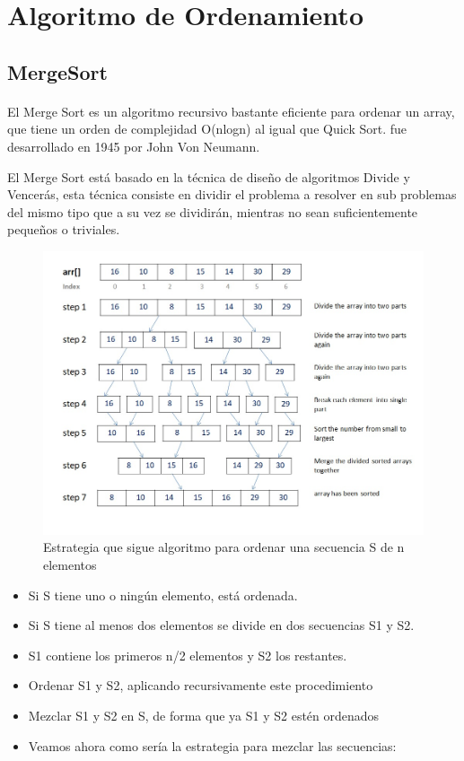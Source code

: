 \documentclass{article}
\begin{document}
	\section{Algoritmo de Ordenamiento}\label{sec:ejercicios}



     \subsection{MergeSort}
    \paragraph{}
    El Merge Sort es un algoritmo recursivo bastante eficiente para ordenar un array, que tiene un orden de complejidad O(nlogn) al igual que Quick Sort. fue desarrollado en 1945 por John Von Neumann.

    El Merge Sort está basado en la técnica de diseño de algoritmos Divide y Vencerás, esta técnica consiste en dividir el problema a resolver en sub problemas del mismo tipo que a su vez se dividirán, mientras no sean suficientemente  pequeños o triviales.
    \begin{figure}[h!]
        \centering
        \includegraphics[width=12cm]{img/mergesort.png}
        \caption{Estrategia que sigue algoritmo para ordenar una secuencia S de n elementos}
        \label{fig:mergesort}
    \end {figure}
    \begin{itemize}
        \item Si S tiene uno o ningún elemento, está ordenada.
        \item Si S tiene al menos dos elementos se divide en dos secuencias S1 y S2.
        \item S1 contiene los primeros n/2 elementos y S2 los restantes.
        \item Ordenar S1 y S2, aplicando recursivamente este procedimiento
        \item Mezclar S1 y S2 en S, de forma que ya S1 y S2 estén ordenados
        \item Veamos ahora como sería la estrategia para mezclar las secuencias:
    \end{itemize}
\end{document}
